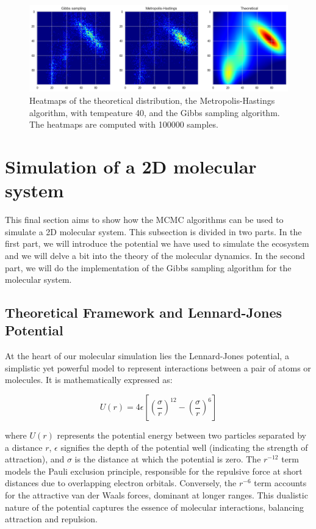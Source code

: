\documentclass{report}
\begin{document}
\begin{figure}[H]
	\centering
	\includegraphics[width=0.75\linewidth]{./Figures/MCMC/heatmaps.png}
	\caption{Heatmaps of the theoretical distribution, the Metropolis-Hastings algorithm, with tempeature 40, and the Gibbs sampling algorithm. The heatmaps are computed with 100000 samples.}
	\label{fig:heatmaps}
\end{figure}

\section{Simulation of a 2D molecular system}
\label{sec:simulation_2d_molecular_system}

This final section aims to show how the MCMC algorithms can be used to simulate a 2D molecular system. This subsection is divided in two parts. In the first part, we will introduce the potential we have used to simulate the ecosystem and we will delve a bit into the theory of the molecular dynamics. In the second part, we will do the implementation of the Gibbs sampling algorithm for the molecular system.

\subsection{Theoretical Framework and Lennard-Jones Potential}
\label{sec:lennard_jones_potential}

At the heart of our molecular simulation lies the Lennard-Jones potential, a simplistic yet powerful model to represent interactions between a pair of atoms or molecules. It is mathematically expressed as:

\[
	U(r) = 4\epsilon \left[ \left( \frac{\sigma}{r} \right)^{12} - \left( \frac{\sigma}{r} \right)^6 \right]
\]

where \( U(r) \) represents the potential energy between two particles separated by a distance \( r \), \( \epsilon \) signifies the depth of the potential well (indicating the strength of attraction), and \( \sigma \) is the distance at which the potential is zero. The \( r^{-12} \) term models the Pauli exclusion principle, responsible for the repulsive force at short distances due to overlapping electron orbitals. Conversely, the \( r^{-6} \) term accounts for the attractive van der Waals forces, dominant at longer ranges. This dualistic nature of the potential captures the essence of molecular interactions, balancing attraction and repulsion.
\end{document}
